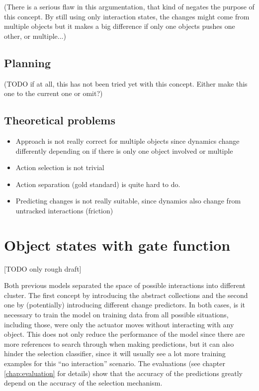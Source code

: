 (There is a serious flaw in this argumentation, that kind of negates the 
purpose of this concept. By still using only interaction states, the changes 
might come from multiple objects but it makes a big difference if only one 
objects pushes one other, or multiple...)

\subsection{Planning}
(TODO if at all, this has not been tried yet with this concept. Either make 
this one to the current one or omit?)

\subsection{Theoretical problems}

\begin{itemize}
\item Approach is not really correct for multiple objects since dynamics change differently 
depending on if there is only one object involved or multiple
\item Action selection is not trivial
\item Action separation (gold standard) is quite hard to do. 
\item Predicting changes is not really suitable, since dynamics also change from untracked 
interactions (friction) 
\end{itemize}

\section{Object states with gate function}

[TODO only rough draft]

Both previous models separated the space of possible interactions into different cluster. The first
concept by introducing the abstract collections and the second one by (potentially) introducing different
change predictors. In both cases, is it necessary to train the model on training data from all possible situations,
including those, were only the actuator moves without interacting with any object. This does not only reduce the 
performance of the model since there are more references to search through when making predictions, but it can also hinder
the selection classifier, since it will usually see a lot more training examples for this \enquote{no interaction} scenario.
The evaluations (see chapter \ref{chap:evaluation} for details) show that the accuracy of the predictions greatly depend
on the accuracy of the selection mechanism. 

